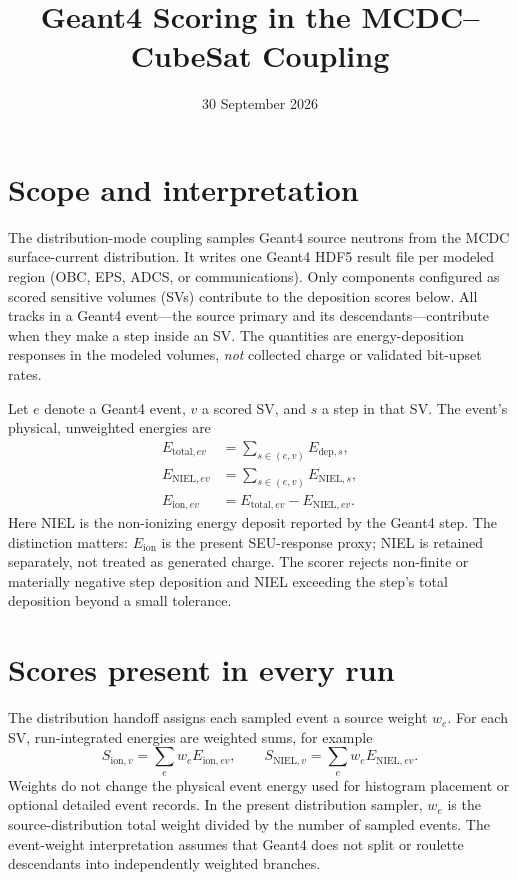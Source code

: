 \documentclass[11pt]{article}
\title{Geant4 Scoring in the MCDC--CubeSat Coupling}
\author{}
\date{30 September 2026}
\begin{document}
\maketitle

\section{Scope and interpretation}

The distribution-mode coupling samples Geant4 source neutrons from the MCDC
surface-current distribution. It writes one Geant4 HDF5 result file per modeled
region (OBC, EPS, ADCS, or communications). Only components configured as scored
sensitive volumes (SVs) contribute to the deposition scores below. All tracks
in a Geant4 event---the source primary and its descendants---contribute when
they make a step inside an SV. The quantities are energy-deposition responses
in the modeled volumes, \emph{not} collected charge or validated bit-upset rates.

Let $e$ denote a Geant4 event, $v$ a scored SV, and $s$ a step in that SV. The
event's physical, unweighted energies are
\begin{align}
 E_{\mathrm{total},ev} &= \sum_{s\in(e,v)} E_{\mathrm{dep},s},\\
 E_{\mathrm{NIEL},ev} &= \sum_{s\in(e,v)} E_{\mathrm{NIEL},s},\\
 E_{\mathrm{ion},ev} &= E_{\mathrm{total},ev}-E_{\mathrm{NIEL},ev}.
\end{align}
Here NIEL is the non-ionizing energy deposit reported by the Geant4 step.
The distinction matters: $E_{\mathrm{ion}}$ is the present SEU-response proxy;
NIEL is retained separately, not treated as generated charge. The scorer
rejects non-finite or materially negative step deposition and NIEL exceeding
the step's total deposition beyond a small tolerance.

\section{Scores present in every run}

The distribution handoff assigns each sampled event a source weight $w_e$.
For each SV, run-integrated energies are weighted sums, for example
\begin{equation}
 S_{\mathrm{ion},v}=\sum_e w_e E_{\mathrm{ion},ev},\qquad
 S_{\mathrm{NIEL},v}=\sum_e w_e E_{\mathrm{NIEL},ev}.
\end{equation}
Weights do not change the physical event energy used for histogram placement
or optional detailed event records. In the present distribution sampler,
$w_e$ is the source-distribution total weight divided by the number of sampled
events. The event-weight interpretation assumes that Geant4 does not split or
roulette descendants into independently weighted branches.
\end{document}
